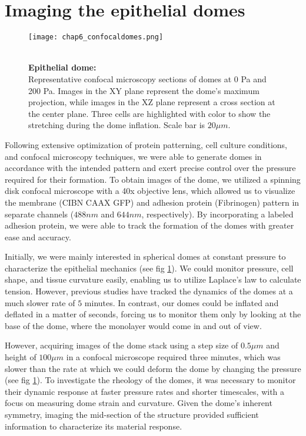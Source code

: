 \hypertarget{imaging-the-epithelial-domes}{%
\section{Imaging the epithelial
domes}\label{imaging-the-epithelial-domes}}

\begin{figure}[h!]
	\begin{minipage}[c]{0.6\textwidth}
		\texttt{[image: chap6\_confocaldomes.png]}
	\end{minipage}\hfill
	\begin{minipage}[c]{0.35\textwidth}
		\caption{\\ \textbf{Epithelial dome:}\\ Representative confocal microscopy sections of domes at 0 Pa and 200 Pa. Images in the XY plane represent the dome's maximum projection, while images in the XZ plane represent a cross section at the center plane. Three cells are highlighted with color to show the stretching during the dome inflation. Scale bar is $20 \mu m$.
		} \label{fig_6_6}
	\end{minipage}
\end{figure}

Following extensive optimization of protein patterning, cell culture conditions, and confocal microscopy techniques, we were able to generate domes in accordance with the intended pattern and exert precise control over the pressure required for their formation. To obtain images of the dome, we utilized a spinning disk confocal microscope with a 40x objective lens, which allowed us to visualize the membrane (CIBN CAAX GFP) and adhesion protein (Fibrinogen) pattern in separate channels ($488nm$ and $644nm$, respectively). By incorporating a labeled adhesion protein, we were able to track the formation of the domes with greater ease and accuracy.

Initially, we were mainly interested in spherical domes at constant pressure to characterize the epithelial mechanics (see fig \ref{fig_6_6}). We could monitor pressure, cell shape, and tissue curvature easily, enabling us to utilize Laplace's law to calculate tension. However, previous studies have tracked the dynamics of the domes at a much slower rate of $5$ minutes. In contrast, our domes could be inflated and deflated in a matter of seconds, forcing us to monitor them only by looking at the base of the dome, where the monolayer would come in and out of view.  

However, acquiring images of the dome stack using a step size of $0.5\mu m$ and height of $100 \mu m$ in a confocal microscope required three minutes, which was slower than the rate at which we could deform the dome by changing the pressure (see fig \ref{fig_6_6}). To investigate the rheology of the domes, it was necessary to monitor their dynamic response at faster pressure rates and shorter timescales, with a focus on measuring dome strain and curvature. Given the dome's inherent symmetry, imaging the mid-section of the structure provided sufficient information to characterize its material response.

